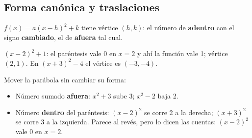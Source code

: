 \subsection{Forma canónica y traslaciones}
\begin{clave} $f(x) = a(x - h)^2 + k$ tiene vértice $(h, k)$: el número de \textbf{adentro} con el signo \textbf{cambiado}, el de \textbf{afuera} tal cual.\end{clave}
\begin{ejemplo} $(x - 2)^2 + 1$: el paréntesis vale 0 en $x = 2$ y ahí la función vale 1; vértice $(2, 1)$. En $(x + 3)^2 - 4$ el vértice es $(-3, -4)$.\end{ejemplo}
\par\noindent\begin{minipage}{0.55\linewidth}
Mover la parábola sin cambiar su forma:
\begin{itemize}
  \item Número sumado \textbf{afuera}: $x^2 + 3$ sube 3; $x^2 - 2$ baja 2.
  \item Número \textbf{dentro} del paréntesis: $(x - 2)^2$ se corre 2 a la derecha; $(x + 3)^2$ se corre 3 a la izquierda. Parece al revés, pero lo dicen las cuentas: $(x - 2)^2$ vale 0 en $x = 2$.
\end{itemize}
\end{minipage}\hfill
\begin{minipage}{0.4\linewidth}\centering
{}
\end{minipage}


